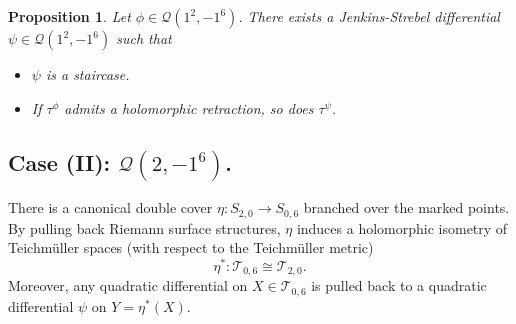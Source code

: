 \documentclass[11pt]{amsart}
\theoremstyle{plain}
\newtheorem{Proposition}[Theorem]{Proposition}
\newcommand{\Tei}{\mathcal{T}}
\newcommand{\Q}{\mathcal{Q}}
\begin{document}
\begin{Proposition}\label{prop:staircase}
Let $\phi\in \Q(1^2, -1^6)$. There exists a Jenkins-Strebel differential $\psi\in \Q(1^2, -1^6)$ 
such that 
\begin{itemize}
  \item $\psi$ is a staircase.
  \item If $\tau^\phi$ admits a holomorphic retraction, so does $\tau^\psi$. 
\end{itemize}
\end{Proposition}





\subsection{Case (II): $\Q(2, -1^6)$.}\label{Case-II}

There is a canonical double cover $\eta: S_{2,0} \to S_{0,6}$
branched over the marked points. By pulling back
Riemann surface structures, $\eta$ induces a holomorphic isometry  of Teichm\"uller spaces (with respect to the Teichm\"uller metric)
$$\eta^* : \Tei_{0,6} \cong \Tei_{2,0}.$$
Moreover, any quadratic differential on $X\in \Tei_{0,6}$ is pulled back  to a 
quadratic differential $\psi$ on $Y= \eta^*(X)$. 
\end{document}
